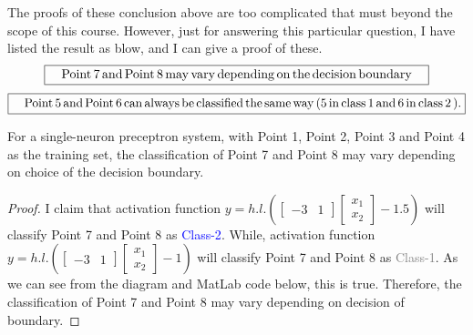 \begin{center}
\end{center}

The proofs of these conclusion above are too complicated that must beyond the scope of this course. However, just for answering this particular question, I have listed the result as blow, and I can give a proof of these.
\begin{equation}
    \boxed{\rm{\quad Point\,7 \, and\, Point\,8\,may\,vary\,depending\,on\,the\,decision\,boundary\quad}}
\end{equation}
\begin{equation}
    \boxed{\rm{\quad Point\,5 \, and\, Point\,6\,can\,always\,be\,classified\,the\,same\,way \,(5\,in\,class\,1\,and\,6\,in\,class\,2\,).}}
\end{equation}


\begin{theorem}
For a single-neuron preceptron system, with Point 1, Point 2, Point 3 and Point 4 as the training set, the classification of Point 7 and Point 8 may vary depending on choice of the decision boundary.
\end{theorem}
\begin{proof}
I claim that activation function $y = h.l.\left( {\left[ {\begin{array}{*{20}{c}}
-3&1
\end{array}} \right]\left[ {\begin{array}{*{20}{c}}
{{x_1}}\\
{{x_2}}
\end{array}} \right] - 1.5} \right)$ will classify Point 7 and Point 8 as \textcolor{blue}{Class-2}. While, activation function $y = h.l.\left( {\left[ {\begin{array}{*{20}{c}}
-3&1
\end{array}} \right]\left[ {\begin{array}{*{20}{c}}
{{x_1}}\\
{{x_2}}
\end{array}} \right] - 1} \right)$ will classify Point 7 and Point 8 as \textcolor{gray}{Class-1}. As we can see from the diagram and MatLab code below, this is true. Therefore, the classification of Point 7 and Point 8 may vary depending on decision of boundary.
\end{proof}

